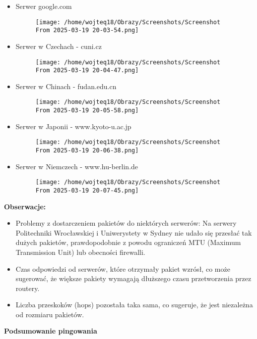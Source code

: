 \documentclass[12pt]{article}
\begin{document}
\begin{itemize}
  \item Serwer google.com
    \begin{figure}[H]
      \centering
      \texttt{[image: /home/wojteq18/Obrazy/Screenshots/Screenshot From 2025-03-19 20-03-54.png]}
      \label{fig:large_google}
    \end{figure}

  \item Serwer w Czechach - cuni.cz
    \begin{figure}[H]
      \centering
      \texttt{[image: /home/wojteq18/Obrazy/Screenshots/Screenshot From 2025-03-19 20-04-47.png]}
      \label{fig:large_cuni}
    \end{figure}

  \item Serwer w Chinach - fudan.edu.cn
    \begin{figure}[H]
      \centering
      \texttt{[image: /home/wojteq18/Obrazy/Screenshots/Screenshot From 2025-03-19 20-05-58.png]}
      \label{fig:large_fudan}
    \end{figure}

  \item Serwer w Japonii - www.kyoto-u.ac.jp
    \begin{figure}[H]
      \centering
      \texttt{[image: /home/wojteq18/Obrazy/Screenshots/Screenshot From 2025-03-19 20-06-38.png]}
      \label{fig:large_kyoto}
    \end{figure}

  \item Serwer w Niemczech - www.hu-berlin.de
    \begin{figure}[H]
      \centering
      \texttt{[image: /home/wojteq18/Obrazy/Screenshots/Screenshot From 2025-03-19 20-07-45.png]}
      \label{fig:large_hu_berlin}
    \end{figure}
\end{itemize}

\vspace{1\baselineskip}
\textbf{Obserwacje:}

\vspace{1\baselineskip}
\begin{itemize}
  \item Problemy z dostarczeniem pakietów do niektórych serwerów: Na serwery Politechniki Wrocławskiej i Uniwerystety w Sydney nie udało
  się przesłać tak dużych pakietów, prawdopodobnie z powodu ograniczeń MTU (Maximum Transmission Unit) lub obecności firewalli.
  \item Czas odpowiedzi od serwerów, które otrzymały pakiet wzrósł, co może sugerować, że większe pakiety wymagają dłuższego czasu
  przetworzenia przez routery.
  \item Liczba przeskoków (hops) pozostała taka sama, co sugeruje, że jest niezależna od rozmiaru pakietów.
\end{itemize}
\vspace{1\baselineskip}
\textbf{Podsumowanie pingowania} \newline
\end{document}
